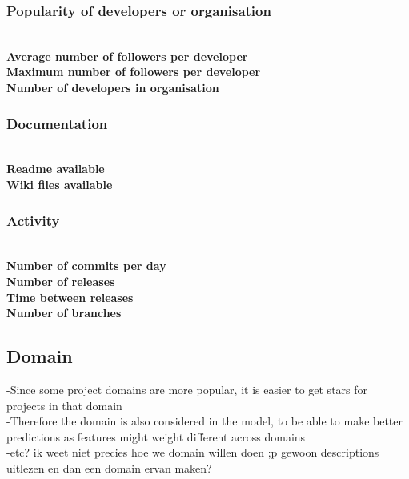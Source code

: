 
    \subsubsection{Popularity of developers or organisation}
    \\
    \textbf{Average number of followers per developer}\\
    \textbf{Maximum number of followers per developer}\\
    \textbf{Number of developers in organisation}\\


    \subsubsection{Documentation}
    \\
    \textbf{Readme available}\\
    \textbf{Wiki files available}\\

    \subsubsection{Activity}
    \\
    \textbf{Number of commits per day}\\
    \textbf{Number of releases}\\
    \textbf{Time between releases}\\
    \textbf{Number of branches}\\


 
    \subsection{Domain}
    -Since some project domains are more popular, it is easier to get stars for projects in that domain \\
    -Therefore the domain is also considered in the model, to be able to make better predictions as features might weight different across domains\\
    -etc? ik weet niet precies hoe we domain willen doen ;p gewoon descriptions uitlezen en dan een domain ervan maken? 

